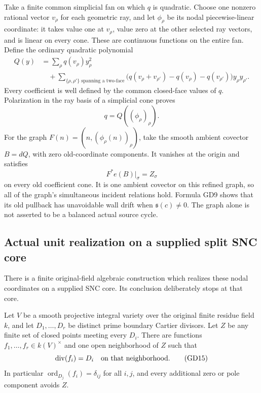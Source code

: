 Take a finite common simplicial fan on which \(q\) is
quadratic.  Choose one nonzero rational vector \(v_\rho\)
for each geometric ray, and let \(\phi_\rho\) be its
nodal piecewise-linear coordinate: it takes value one
at \(v_\rho\), value zero at the other selected ray
vectors, and is linear on every cone.  These are
continuous functions on the entire fan.  Define the
ordinary quadratic polynomial
\[
 \begin{split}
 Q(y)&=\sum_\rho q(v_\rho)y_\rho^2\\
 &\quad+\sum_{\{\rho,\rho'\}\text{ spanning a two-face}}
   \bigl(q(v_\rho+v_{\rho'})-q(v_\rho)-q(v_{\rho'})\bigr)
                                      y_\rho y_{\rho'}.
 \end{split}
 \tag{GD12}
\]
Every coefficient is well defined by the common closed-face
values of \(q\).  Polarization in the ray basis of a
simplicial cone proves
\[
                    q=Q((\phi_\rho)_\rho).
 \tag{GD13}
\]
For the graph
\(F(n)=(n,(\phi_\rho(n))_\rho)\), take the smooth ambient
covector \(B=dQ\), with zero old-coordinate components.
It vanishes at the origin and satisfies
\[
                  F^*e(B)|_\sigma=Z_\sigma
 \tag{GD14}
\]
on every old coefficient cone.  It is one ambient covector
on this refined graph, so all of the graph's simultaneous
incident relations hold.  Formula GD9 shows that its old
pullback has unavoidable wall drift when \(\mathfrak s(c)\ne0\).
The graph alone is not asserted to be a balanced actual
source cycle.

\subsection{Actual unit realization on a supplied split SNC core}

There is a finite original-field algebraic construction
which realizes these nodal coordinates on a supplied SNC
core.  Its conclusion deliberately stops at that core.

\begin{lemma}
\label{lem:r13-semilocal-boundary-generators}
Let \(V\) be a smooth projective integral variety over the
original finite residue field \(k\), and let
\(D_1,\ldots,D_r\) be distinct prime boundary Cartier
divisors.  Let \(Z\) be any finite set of closed points
meeting every \(D_i\).  There are functions
\(f_1,\ldots,f_r\in k(V)^\times\) and one open
neighborhood of \(Z\) such that
\[
                     \operatorname{div}(f_i)=D_i
                      \quad\hbox{on that neighborhood}.
 \tag{GD15}
\]
In particular
\(\operatorname{ord}_{D_j}(f_i)=\delta_{ij}\) for all
\(i,j\), and every additional zero or pole component
avoids \(Z\).
\end{lemma}

